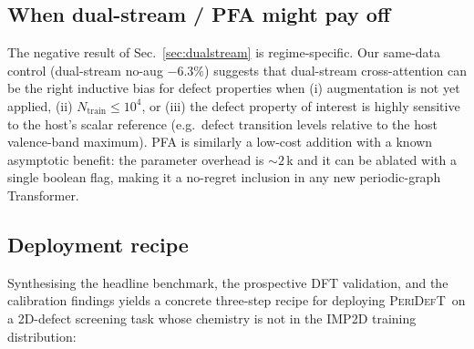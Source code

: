 \documentclass[11pt,a4paper]{article}
\newcommand{\modelname}{\textsc{PeriDefT}}
\begin{document}
\subsection{When dual-stream / PFA might pay off}
The negative result of Sec.~\ref{sec:dualstream} is regime-specific.
Our same-data control (dual-stream no-aug $-6.3\%$) suggests that
dual-stream cross-attention can be the right inductive bias for
defect properties when (i) augmentation is not yet applied, (ii)
$N_{\mathrm{train}} \le 10^4$, or (iii) the defect property of
interest is highly sensitive to the host's scalar reference (e.g.\
defect transition levels relative to the host valence-band maximum).
PFA is similarly a low-cost addition with a known asymptotic
benefit: the parameter overhead is $\sim 2$\,k and it can be
ablated with a single boolean flag, making it a no-regret
inclusion in any new periodic-graph Transformer.

\subsection{Deployment recipe}\label{sec:deploy}
Synthesising the headline benchmark, the prospective DFT validation,
and the calibration findings yields a concrete three-step recipe for
deploying \modelname\ on a 2D-defect screening task whose chemistry
is not in the IMP2D training distribution:
\end{document}
